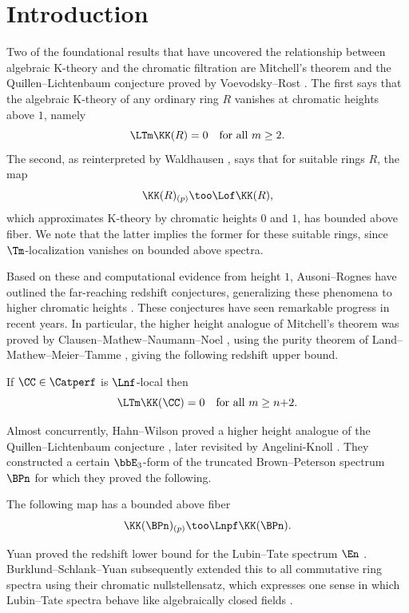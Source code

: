 \section*{Introduction}

Two of the foundational results that have uncovered the relationship between algebraic K-theory and the chromatic filtration are Mitchell's theorem \cite{mitchell} and the Quillen--Lichtenbaum conjecture proved by Voevodsky--Rost \cite{Voevodsky1,Voevodsky2}.
The first says that the algebraic K-theory of any ordinary ring $R$ vanishes at chromatic heights above $1$, namely
\[
	\LTm \KK(R) = 0
	\quad \text{for all $m \geq 2$}.
\]
The second, as reinterpreted by Waldhausen \cite{Waldhausen1984}, says that for suitable rings $R$, the map
\[
	\KK(R)_{(p)} \too \Lof \KK(R),
\]
which approximates K-theory by chromatic heights $0$ and $1$, has bounded above fiber.
We note that the latter implies the former for these suitable rings, since $\Tm$-localization vanishes on bounded above spectra.

Based on these and computational evidence from height $1$, Ausoni--Rognes have outlined the far-reaching redshift conjectures, generalizing these phenomena to higher chromatic heights \cite{RognesOberwolfach,AR02,AR08}.
These conjectures have seen remarkable progress in recent years.
In particular, the higher height analogue of Mitchell's theorem was proved by Clausen--Mathew--Naumann--Noel \cite{DescVan}, using the purity theorem of Land--Mathew--Meier--Tamme \cite{purity}, giving the following redshift upper bound.

\begin{theorem}\label{main-thm-intro}
	If $\CC \in \Catperf$ is $\Lnf$-local then
	\[
		\LTm \KK(\CC) = 0
		\quad \text{for all $m \geq n{+}2$}.
	\]
\end{theorem}

Almost concurrently, Hahn--Wilson proved a higher height analogue of the Quillen--Lichtenbaum conjecture \cite{HW}, later revisited by Angelini-Knoll \cite{AK-BPn}.
They constructed a certain $\bbE_3$-form of the truncated Brown--Peterson spectrum $\BPn$ for which they proved the following.

\begin{thm}[{\cite[Theorem B]{HW}}]\label{QL}
	The following map has a bounded above fiber
	\[
		\KK(\BPn)_{(p)} \too \Lnpf \KK(\BPn).
	\]
\end{thm}

Yuan proved the redshift lower bound for the Lubin--Tate spectrum $\En$ \cite{yuan}.
Burklund--Schlank--Yuan subsequently extended this to all commutative ring spectra using their chromatic nullstellensatz, which expresses one sense in which Lubin--Tate spectra behave like algebraically closed fields \cite{null}.

